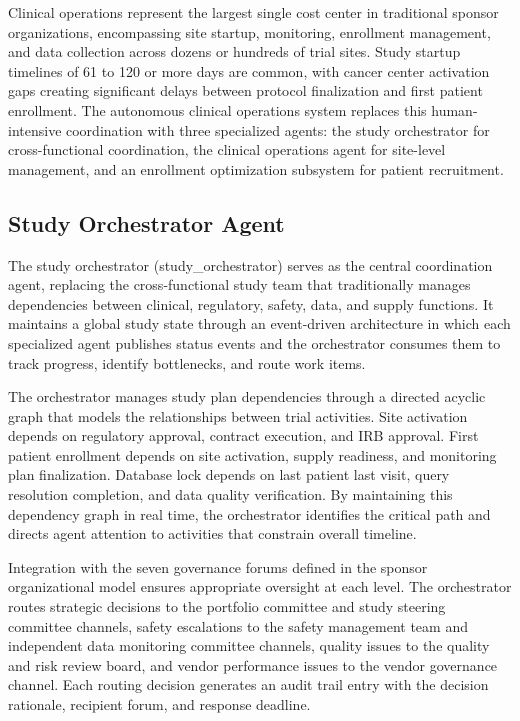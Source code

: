 
Clinical operations represent the largest single cost center in traditional sponsor
organizations, encompassing site startup, monitoring, enrollment management, and data
collection across dozens or hundreds of trial sites. Study startup timelines of 61 to
120 or more days are common, with cancer center activation gaps creating significant
delays between protocol finalization and first patient enrollment. The autonomous clinical
operations system replaces this human-intensive coordination with three specialized agents:
the study orchestrator for cross-functional coordination, the clinical operations agent for
site-level management, and an enrollment optimization subsystem for patient recruitment.

\subsection{Study Orchestrator Agent}

The study orchestrator (study\_orchestrator) serves as the central coordination agent,
replacing the cross-functional study team that traditionally manages dependencies between
clinical, regulatory, safety, data, and supply functions. It maintains a global study state
through an event-driven architecture in which each specialized agent publishes status events
and the orchestrator consumes them to track progress, identify bottlenecks, and route work
items.

The orchestrator manages study plan dependencies through a directed acyclic graph that models
the relationships between trial activities. Site activation depends on regulatory approval,
contract execution, and IRB approval. First patient enrollment depends on site activation,
supply readiness, and monitoring plan finalization. Database lock depends on last patient
last visit, query resolution completion, and data quality verification. By maintaining this
dependency graph in real time, the orchestrator identifies the critical path and directs
agent attention to activities that constrain overall timeline.

Integration with the seven governance forums defined in the sponsor organizational model
ensures appropriate oversight at each level. The orchestrator routes strategic decisions to
the portfolio committee and study steering committee channels, safety escalations to the
safety management team and independent data monitoring committee channels, quality issues
to the quality and risk review board, and vendor performance issues to the vendor governance
channel. Each routing decision generates an audit trail entry with the decision rationale,
recipient forum, and response deadline.

